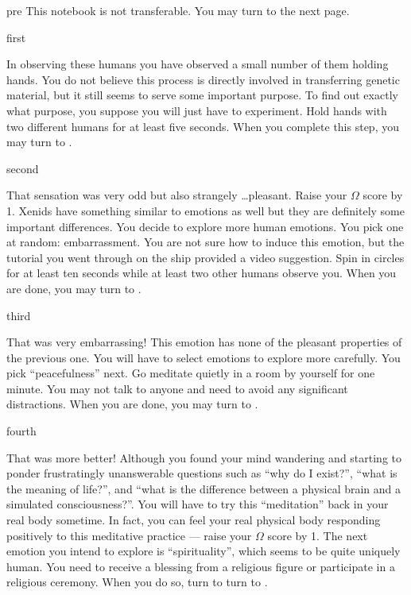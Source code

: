\documentclass[notebook]{guildcamp1}
\begin{document}
\startnotebook{\nBrainDamage{}}

\begin{page}{pre}
This notebook is not transferable. You may turn to the next page.
\end{page}

\begin{page}{first}

In observing these humans you have observed a small number of them holding hands. You do not believe this process is directly involved in transferring genetic material, but it still seems to serve some important purpose. To find out exactly what purpose, you suppose you will just have to experiment. Hold hands with two different humans for at least five seconds. When you complete this step, you may turn to .

\end{page}

\begin{page}{second}

That sensation was very odd but also strangely \ldots pleasant. Raise your $\Omega$ score by 1. Xenids have something similar to emotions as well but they are definitely some important differences. You decide to explore more human emotions. You pick one at random: embarrassment. You are not sure how to induce this emotion, but the tutorial you went through on the ship provided a video suggestion. Spin in circles for at least ten seconds while at least two other humans observe you. When you are done, you may turn to .

\end{page}

\begin{page}{third}

That was very embarrassing! This emotion has none of the pleasant properties of the previous one. You will have to select emotions to explore more carefully. You pick ``peacefulness'' next. Go meditate quietly in a room by yourself for one minute. You may not talk to anyone and need to avoid any significant distractions. When you are done, you may turn to .

\end{page}

\begin{page}{fourth}

That was more better! Although you found your mind wandering and starting to ponder frustratingly unanswerable questions such as ``why do I exist?'', ``what is the meaning of life?'', and ``what is the difference between a physical brain and a simulated consciousness?''. You will have to try this ``meditation'' back in your real body sometime. In fact, you can feel your real physical body responding positively to this meditative practice --- raise your $\Omega$ score by 1. The next emotion you intend to explore is ``spirituality'', which seems to be quite uniquely human. You need to receive a blessing from a religious figure or participate in a religious ceremony. When you do so, turn to turn to .

\end{page}
\end{document}

